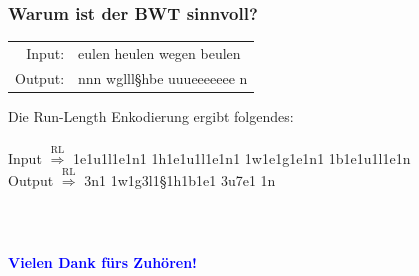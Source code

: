 \documentclass{beamer}
\newcommand{\R}{\Rightarrow}
\newcommand{\blue}{\textcolor{blue}}
\begin{document}
\begin{frame}
    \frametitle{Warum ist der BWT sinnvoll?}
    \begin{tcolorbox}[yellow]
        \begin{center}
            \begin{tabular}{rl}
                Input: &eulen heulen wegen beulen\\
                Output: &nnn wglll§hbe uuueeeeeee n
            \end{tabular}
        \end{center}
    \end{tcolorbox}\pause\vspace*{0.3cm}
    Die Run-Length Enkodierung ergibt folgendes:\\~\\\pause
    \hspace*{0.3cm}
    Input \hspace*{0.3cm}$\overset{\text{RL}}{\R}$ 1e1u1l1e1n1 1h1e1u1l1e1n1 1w1e1g1e1n1 1b1e1u1l1e1n\\\pause
    \hspace*{0.3cm}
    Output $\overset{\text{RL}}{\R}$ 3n1 1w1g3l1§1h1b1e1 3u7e1 1n
    \pause\vspace*{0.3cm}
    \begin{tcolorbox}[standard, title=Wann ist BWT also sinnvoll:]
        \begin{itemize}
        \end{itemize}
    \end{tcolorbox}
\end{frame}
\begin{frame}
    \frametitle{~}
    \begin{center}
        \Large{\blue{\textbf{Vielen Dank fürs Zuhören!}}}
    \end{center}
\end{frame}
\end{document}
